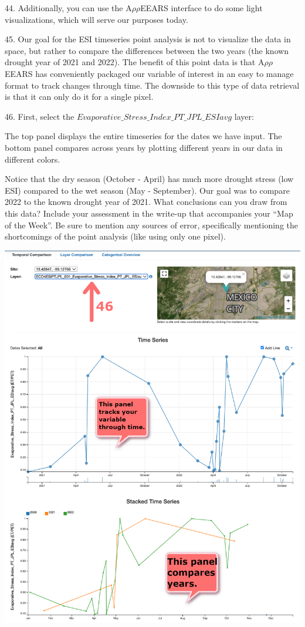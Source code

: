 \documentclass[oneside,a4paper,11pt,explicit]{book}
\begin{document}
44. Additionally, you can use the A$\rho\rho$EEARS interface to do some light visualizations, which will serve our purposes today.

45. Our goal for the ESI timeseries point analysis is not to visualize the data in space, but rather to compare the differences between the two years (the known drought year of 2021 and 2022). The benefit of this point data is that A$\rho\rho$EEARS has conveniently packaged our variable of interest in an easy to manage format to track changes through time. The downside to this type of data retrieval is that it can only do it for a single pixel. 

46. First, select the $Evaporative\_Stress\_Index\_PT\_JPL\_ESIavg$ layer:


The top panel displays the entire timeseries for the dates we have input. The bottom panel compares across years by plotting different years in our data in different colors. 

Notice that the dry season (October - April) has much more drought stress (low ESI) compared to the wet season (May - September). Our goal was to compare 2022 to the known drought year of 2021. What conclusions can you draw from this data? Include your assessment in the write-up that accompanies your ``Map of the Week''. Be sure to mention any sources of error, specifically mentioning the shortcomings of the point analysis (like using only one pixel).

\vspace{.5em}

\centerline{\includegraphics[width=.6\textwidth]{exploreESIpoint.png}}
\end{document}
